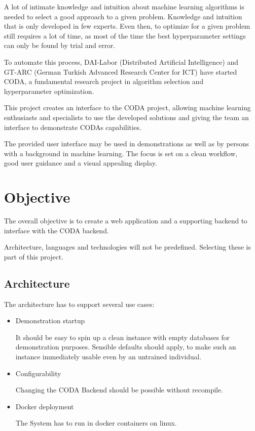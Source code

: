 \documentclass[12pt,a4paper,titlepage,oneside,BCOR1cm]{scrreprt}
\begin{document}
A lot of intimate knowledge and intuition about machine learning algorithms is needed to select a good approach to a given problem. Knowledge and intuition that is only developed in few experts. Even then, to optimize for a given problem still requires a lot of time, as most of the time the best hyperparameter settings can only be found by trial and error.

To automate this process, DAI-Labor (Distributed Artificial Intelligence) and GT-ARC (German Turkish Advanced Research Center for ICT) have started CODA, a fundamental research project in algorithm selection and hyperparameter optimization. \cite{CODA-Steckbrief}

This project creates an interface to the CODA project, allowing machine learning enthusiasts and specialists to use the developed solutions and giving the team an interface to demonstrate CODAs capabilities.

The provided user interface may be used in demonstrations as well as by persons with a background in machine learning. The focus is set on a clean workflow, good user guidance and a visual appealing display.




\chapter{Objective}
The overall objective is to create a web application and a supporting backend to interface with the CODA backend. 

Architecture, languages and technologies will not be predefined. Selecting these is part of this project.

\section{Architecture}

The architecture has to support several use cases:
\begin{itemize}
  \item Demonstration startup
  
  It should be easy to spin up a clean instance with empty databases for demonstration purposes. Sensible defaults should apply, to make such an instance immediately usable even by an untrained individual.

  \item Configurability

  Changing the CODA Backend should be possible without recompile.

  \item Docker deployment

  The System has to run in docker containers on linux.

\end{itemize}
\end{document}
